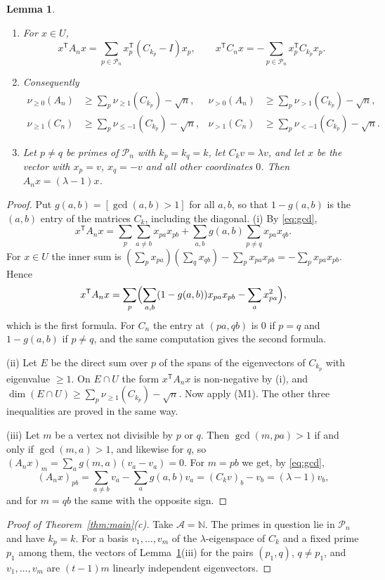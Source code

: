 \documentclass[11pt]{amsart}
\newtheorem{lemma}[theorem]{Lemma}
\theoremstyle{definition}
\theoremstyle{remark}
\newcommand{\N}{\mathbb N}
\newcommand{\nuge}[1]{\nu_{\ge #1}}
\newcommand{\nule}[1]{\nu_{\le #1}}
\begin{document}
\begin{lemma}\label{lem:blocks}
\begin{enumerate}[label=\textup{(\roman*)}]
\item For $x\in U$,
\[
x^{\mathsf T}A_nx=\sum_{p\in\mathcal P_n}x_p^{\mathsf T}(C_{k_p}-I)x_p,\qquad x^{\mathsf T}C_nx=-\sum_{p\in\mathcal P_n}x_p^{\mathsf T}C_{k_p}x_p .
\]
\item Consequently
\begin{align*}
\nuge0(A_n)&\ge\sum_{p}\nuge1(C_{k_p})-\sqrt n, & \nu_{>0}(A_n)&\ge\sum_{p}\nu_{>1}(C_{k_p})-\sqrt n,\\
\nuge1(C_n)&\ge\sum_{p}\nule{-1}(C_{k_p})-\sqrt n, & \nu_{>1}(C_n)&\ge\sum_{p}\nu_{<-1}(C_{k_p})-\sqrt n .
\end{align*}
\item Let $p\ne q$ be primes of $\mathcal P_n$ with $k_p=k_q=k$, let $C_kv=\lambda v$, and let $x$ be the vector with $x_p=v$, $x_q=-v$ and all other coordinates $0$. Then $A_nx=(\lambda-1)x$.
\end{enumerate}
\end{lemma}
\begin{proof}
Put $g(a,b)=[\gcd(a,b)>1]$ for all $a,b$, so that $1-g(a,b)$ is the $(a,b)$ entry of the matrices $C_k$, including the diagonal. (i) By \eqref{eq:gcd},
\[
x^{\mathsf T}A_nx=\sum_p\sum_{a\ne b}x_{pa}x_{pb}+\sum_{a,b}g(a,b)\sum_{p\ne q}x_{pa}x_{qb}.
\]
For $x\in U$ the inner sum is $(\sum_px_{pa})(\sum_qx_{qb})-\sum_px_{pa}x_{pb}=-\sum_px_{pa}x_{pb}$. Hence
\[
x^{\mathsf T}A_nx=\sum_p\Bigl(\sum_{a,b}(1-g(a,b))x_{pa}x_{pb}-\sum_ax_{pa}^2\Bigr),
\]
which is the first formula. For $C_n$ the entry at $(pa,qb)$ is $0$ if $p=q$ and $1-g(a,b)$ if $p\ne q$, and the same computation gives the second formula.

(ii) Let $E$ be the direct sum over $p$ of the spans of the eigenvectors of $C_{k_p}$ with eigenvalue $\ge1$. On $E\cap U$ the form $x^{\mathsf T}A_nx$ is non-negative by (i), and $\dim(E\cap U)\ge\sum_p\nuge1(C_{k_p})-\sqrt n$. Now apply (M1). The other three inequalities are proved in the same way.

(iii) Let $m$ be a vertex not divisible by $p$ or $q$. Then $\gcd(m,pa)>1$ if and only if $\gcd(m,a)>1$, and likewise for $q$, so $(A_nx)_m=\sum_a g(m,a)(v_a-v_a)=0$. For $m=pb$ we get, by \eqref{eq:gcd},
\[
(A_nx)_{pb}=\sum_{a\ne b}v_a-\sum_ag(a,b)v_a=(C_kv)_b-v_b=(\lambda-1)v_b ,
\]
and for $m=qb$ the same with the opposite sign.
\end{proof}

\begin{proof}[Proof of Theorem~\ref{thm:main}(c)]
Take $\mathcal A=\N$. The primes in question lie in $\mathcal P_n$ and have $k_p=k$. For a basis $v_1,\dots,v_m$ of the $\lambda$-eigenspace of $C_k$ and a fixed prime $p_1$ among them, the vectors of Lemma~\ref{lem:blocks}(iii) for the pairs $(p_1,q)$, $q\ne p_1$, and $v_1,\dots,v_m$ are $(t-1)m$ linearly independent eigenvectors.
\end{proof}
\end{document}
